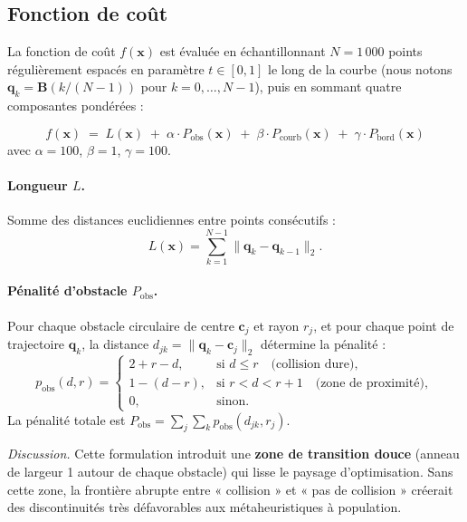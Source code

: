 \subsection{Fonction de coût}
\label{sec:cost}

La fonction de coût $f(\mathbf{x})$ est évaluée en échantillonnant
$N = 1\,000$ points régulièrement espacés en paramètre $t \in [0,1]$ le long
de la courbe (nous notons $\mathbf{q}_k = \mathbf{B}(k/(N-1))$ pour
$k = 0, \ldots, N-1$), puis en sommant quatre composantes pondérées :

\begin{equation}
\label{eq:cost}
  f(\mathbf{x}) \;=\; L(\mathbf{x})
    \;+\; \alpha \cdot P_{\text{obs}}(\mathbf{x})
    \;+\; \beta \cdot P_{\text{courb}}(\mathbf{x})
    \;+\; \gamma \cdot P_{\text{bord}}(\mathbf{x})
\end{equation}
avec $\alpha = 100$, $\beta = 1$, $\gamma = 100$.

\paragraph{Longueur $L$.}
Somme des distances euclidiennes entre points consécutifs :
\[
  L(\mathbf{x}) = \sum_{k=1}^{N-1} \|\mathbf{q}_k - \mathbf{q}_{k-1}\|_2.
\]

\paragraph{Pénalité d'obstacle $P_{\text{obs}}$.}
Pour chaque obstacle circulaire de centre $\mathbf{c}_j$ et rayon $r_j$, et
pour chaque point de trajectoire $\mathbf{q}_k$, la distance
$d_{jk} = \|\mathbf{q}_k - \mathbf{c}_j\|_2$ détermine la pénalité :
\[
  p_{\text{obs}}(d, r) =
  \begin{cases}
    2 + r - d, & \text{si } d \leq r \quad \text{(collision dure)}, \\
    1 - (d - r), & \text{si } r < d < r+1 \quad \text{(zone de proximité)}, \\
    0, & \text{sinon}.
  \end{cases}
\]
La pénalité totale est $P_{\text{obs}} = \sum_j \sum_k p_{\text{obs}}(d_{jk}, r_j)$.

\emph{Discussion.}  Cette formulation introduit une \textbf{zone de transition
douce} (anneau de largeur 1 autour de chaque obstacle) qui lisse le paysage
d'optimisation.  Sans cette zone, la frontière abrupte entre « collision » et
« pas de collision » créerait des discontinuités très défavorables aux
métaheuristiques à population.

